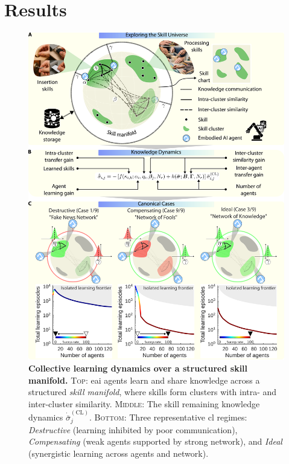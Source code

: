 \documentclass[12pt]{article}
\begin{document}
\section*{Results}\label{sec:results}

\begin{figure}[t!]
	\centering
	\includegraphics[width=14cm]{collective_learning_and_skill_manifold_conceptualization.png}
	\caption[] {\label{fig:collective_learning_and_skill_manifold_conceptualization_revised} \textbf{Collective learning dynamics over a structured skill manifold.} \textsc{Top}: \ac{eai} agents learn and share knowledge across a structured \textit{skill manifold}, where skills form clusters with intra- and inter-cluster similarity. \textsc{Middle}: The skill remaining knowledge dynamics $\dot{\bar{\sigma}}^{(\mathrm{CL})}_j$. \textsc{Bottom}: Three representative \ac{cl} regimes: \textit{Destructive} (learning inhibited by poor communication), \textit{Compensating} (weak agents supported by strong network), and \textit{Ideal} (synergistic learning across agents and network).}
\end{figure}
\end{document}
